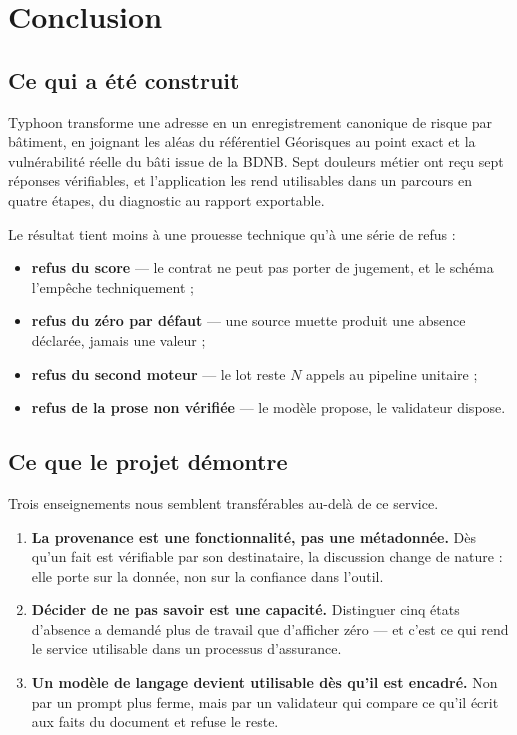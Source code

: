 \chapter{Conclusion}
\label{ch:conclusion}

\section{Ce qui a été construit}

Typhoon transforme une adresse en un enregistrement canonique de risque par
bâtiment, en joignant les aléas du référentiel Géorisques au point exact et la
vulnérabilité réelle du bâti issue de la BDNB. Sept douleurs métier ont reçu
sept réponses vérifiables, et l'application les rend utilisables dans un parcours
en quatre étapes, du diagnostic au rapport exportable.

Le résultat tient moins à une prouesse technique qu'à une série de refus :

\begin{itemize}
  \item \textbf{refus du score} — le contrat ne peut pas porter de jugement, et
    le schéma l'empêche techniquement ;
  \item \textbf{refus du zéro par défaut} — une source muette produit une absence
    déclarée, jamais une valeur ;
  \item \textbf{refus du second moteur} — le lot reste \(N\) appels au pipeline
    unitaire ;
  \item \textbf{refus de la prose non vérifiée} — le modèle propose, le
    validateur dispose.
\end{itemize}

\section{Ce que le projet démontre}

Trois enseignements nous semblent transférables au-delà de ce service.

\begin{enumerate}
  \item \textbf{La provenance est une fonctionnalité, pas une métadonnée.} Dès
    qu'un fait est vérifiable par son destinataire, la discussion change de
    nature : elle porte sur la donnée, non sur la confiance dans l'outil.
  \item \textbf{Décider de ne pas savoir est une capacité.} Distinguer cinq
    états d'absence a demandé plus de travail que d'afficher zéro — et c'est ce
    qui rend le service utilisable dans un processus d'assurance.
  \item \textbf{Un modèle de langage devient utilisable dès qu'il est encadré.}
    Non par un prompt plus ferme, mais par un validateur qui compare ce qu'il
    écrit aux faits du document et refuse le reste.
\end{enumerate}

